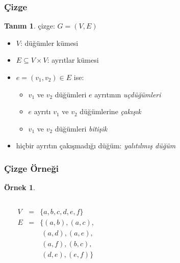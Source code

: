 \documentclass[dvipsnames]{beamer}
\theoremstyle{definition}
\newtheorem{tanim}[theorem]{Tanım}
\theoremstyle{example}
\newtheorem{ornek}[theorem]{Örnek}
\theoremstyle{plain}
\begin{document}
\begin{frame}
  \frametitle{Çizge}

  \begin{tanim}
    \alert{çizge}: $G=(V,E)$

    \begin{itemize}
      \item $V$: düğümler kümesi
      \item $E \subseteq V \times V$: ayrıtlar kümesi
    \end{itemize}
  \end{tanim}

  \pause
  \begin{itemize}
    \item $e=(v_1,v_2) \in E$ ise:
    \begin{itemize}
      \item $v_1$ ve $v_2$ düğümleri $e$ ayrıtının \emph{uçdüğümleri}
      \item $e$ ayrıtı $v_1$ ve $v_2$ düğümlerine  \emph{çakışık}
      \item $v_1$ ve $v_2$ düğümleri  \emph{bitişik}
    \end{itemize}

    \pause
    \item hiçbir ayrıtın çakışmadığı düğüm: \emph{yalıtılmış düğüm}
  \end{itemize}
\end{frame}

\begin{frame}
  \frametitle{Çizge Örneği}

  \begin{ornek}
    \begin{columns}
      \begin{center}
      \end{center}

      \pause
      $\begin{array}{lcl}
        V & = & \{a,b,c,d,e,f\}\\
        E & = & \{(a,b),(a,c),\\
          &   & ~(a,d),(a,e),\\
          &   & ~(a,f),(b,c),\\
          &   & ~(d,e),(e,f)\}
      \end{array}$
    \end{columns}
  \end{ornek}
\end{frame}
\end{document}
